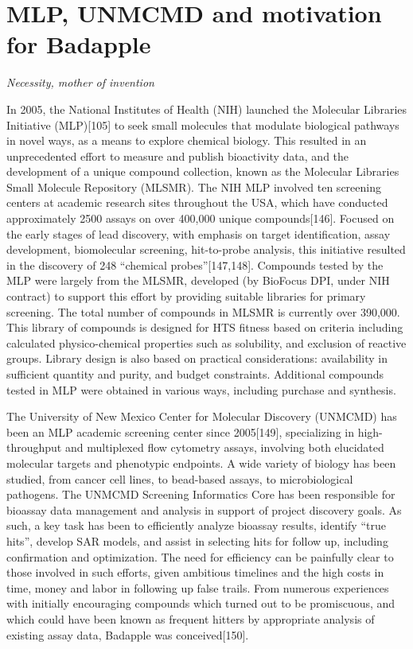 \section{MLP, UNMCMD and motivation for Badapple}

\emph{Necessity, mother of invention}

In 2005, the National Institutes of Health (NIH) launched the Molecular Libraries Initiative (MLP)[105] to seek small molecules that modulate biological pathways in novel ways, as a means to explore chemical biology. This resulted in an unprecedented effort to measure and publish bioactivity data, and the development of a unique compound collection, known as the Molecular Libraries Small Molecule Repository (MLSMR). The NIH MLP involved ten screening centers at academic research sites throughout the USA, which have conducted approximately 2500 assays on over 400,000 unique compounds[146]. Focused on the early stages of lead discovery, with emphasis on target identification, assay development, biomolecular screening, hit-to-probe analysis, this initiative resulted in the discovery of 248 “chemical probes”[147,148]. Compounds tested by the MLP were largely from the MLSMR, developed (by BioFocus DPI, under NIH contract) to support this effort by providing suitable libraries for primary screening. The total number of compounds in MLSMR is currently over 390,000. This library of compounds is designed for HTS fitness based on criteria including calculated physico-chemical properties such as solubility, and exclusion of reactive groups. Library design is also based on practical considerations: availability in sufficient quantity and purity, and budget constraints. Additional compounds tested in MLP were obtained in various ways, including purchase and synthesis.

The University of New Mexico Center for Molecular Discovery (UNMCMD) has been an MLP academic screening center since 2005[149], specializing in high-throughput and multiplexed flow cytometry assays, involving both elucidated molecular targets and phenotypic endpoints. A wide variety of biology has been studied, from cancer cell lines, to bead-based assays, to microbiological pathogens. The UNMCMD Screening Informatics Core has been responsible for bioassay data management and analysis in support of project discovery goals. As such, a key task has been to efficiently analyze bioassay results, identify “true hits”, develop SAR models, and assist in selecting hits for follow up, including confirmation and optimization. The need for efficiency can be painfully clear to those involved in such efforts, given ambitious timelines and the high costs in time, money and labor in following up false trails. From numerous experiences with initially encouraging compounds which turned out to be promiscuous, and which could have been known as frequent hitters by appropriate analysis of existing assay data, Badapple was conceived[150].

